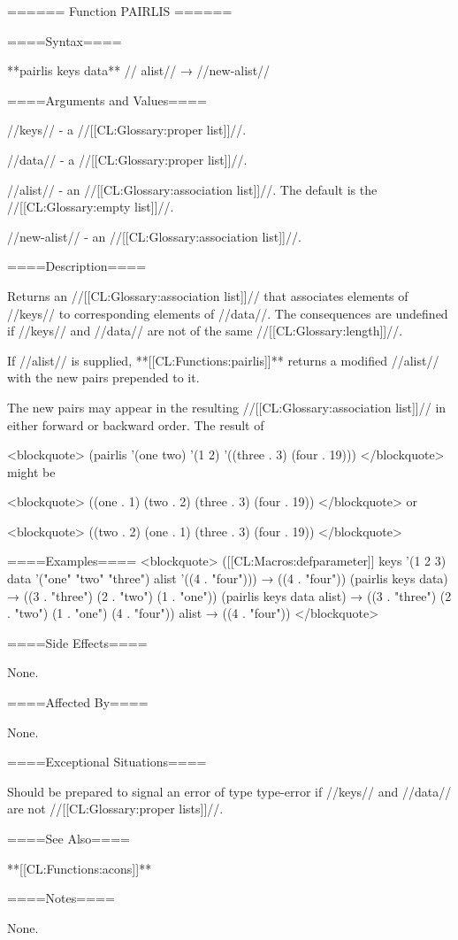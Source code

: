 ====== Function PAIRLIS ======

====Syntax====

**pairlis {keys data** //\opt} alist// → //new-alist//

====Arguments and Values====

//keys// - a //[[CL:Glossary:proper list]]//.

//data// - a //[[CL:Glossary:proper list]]//.

//alist// - an //[[CL:Glossary:association list]]//. The default is the //[[CL:Glossary:empty list]]//.

//new-alist// - an //[[CL:Glossary:association list]]//.

====Description====

Returns an //[[CL:Glossary:association list]]// that associates elements of //keys// to corresponding elements of //data//. The consequences are undefined if //keys// and //data// are not of the same //[[CL:Glossary:length]]//.

If //alist// is supplied, **[[CL:Functions:pairlis]]** returns a modified //alist// with the new pairs prepended to it.

The new pairs may appear in the resulting //[[CL:Glossary:association list]]// in either forward or backward order. The result of

<blockquote> (pairlis '(one two) '(1 2) '((three . 3) (four . 19))) </blockquote> might be

<blockquote> ((one . 1) (two . 2) (three . 3) (four . 19)) </blockquote> or

<blockquote> ((two . 2) (one . 1) (three . 3) (four . 19)) </blockquote>

====Examples==== <blockquote> ([[CL:Macros:defparameter]] keys '(1 2 3) data '("one" "two" "three") alist '((4 . "four"))) → ((4 . "four")) (pairlis keys data) → ((3 . "three") (2 . "two") (1 . "one")) (pairlis keys data alist) → ((3 . "three") (2 . "two") (1 . "one") (4 . "four")) alist → ((4 . "four")) </blockquote>

====Side Effects====

None.

====Affected By====

None.

====Exceptional Situations====

Should be prepared to signal an error of type type-error if //keys// and //data// are not //[[CL:Glossary:proper lists]]//.

====See Also====

**[[CL:Functions:acons]]**

====Notes====

None.

